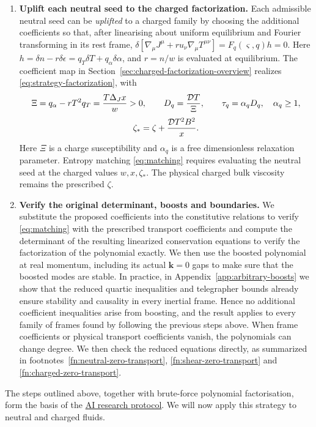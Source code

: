 \begin{enumerate}
\item \textbf{Uplift each neutral seed to the charged factorization.}
Each admissible neutral seed can be \emph{uplifted} to a charged family by
choosing the additional coefficients so that, after linearising about
uniform equilibrium and Fourier transforming in its rest frame,
$\delta[\nabla_\mu J^\mu+r u_\nu\nabla_\mu T^{\mu\nu}]
=F_q(\varsigma,q)h=0$.
Here $h=\delta n-r\delta\epsilon=q_T\delta T+q_\alpha\delta\alpha$,
and $r=n/w$ is evaluated at equilibrium. The coefficient map in
Section~\ref{sec:charged-factorization-overview} realizes
\eqref{eq:strategy-factorization}, with
\begin{equation}\label{eq:effective}
 \begin{gathered}
 \Xi=q_\alpha-rT^2q_T=\frac{T\Delta_Jx}{w}>0,\qquad
 D_q=\frac{\mathcal D T}{\Xi},\qquad
 \tau_q=\alpha_qD_q,\quad\alpha_q\geq1,\\[3pt]
 \zeta_* =\zeta+\frac{\mathcal D T^2B^2}{x}.
 \end{gathered}
\end{equation}
Here $\Xi$ is a charge susceptibility and $\alpha_q$ is a free
dimensionless relaxation parameter. Entropy matching \eqref{eq:matching}
requires evaluating the neutral seed at the charged values $w,x,\zeta_*$.
The physical charged bulk viscosity remains the prescribed $\zeta$.

\item \textbf{Verify the original determinant, boosts and boundaries.}
We substitute the proposed coefficients into the constitutive relations to verify \eqref{eq:matching} with the prescribed transport coefficients and compute the determinant of the resulting linearized conservation equations to verify the factorization of the polynomial exactly. We then use the boosted polynomial
at real momentum, including its actual $\mathbf k=0$
gaps to make sure that the boosted modes are stable.  In practice, in Appendix~\ref{app:arbitrary-boosts} we show that the reduced quartic inequalities and telegrapher bounds already ensure stability and causality in every inertial frame. Hence no additional coefficient inequalities arise from boosting, and the result applies to every family of frames found by following the previous steps above. When frame coefficients or physical transport coefficients vanish, the
polynomials can change degree. We then check the reduced equations
directly, as summarized in footnotes~\ref{fn:neutral-zero-transport},
\ref{fn:shear-zero-transport} and \ref{fn:charged-zero-transport}.
\end{enumerate}
The steps outlined above, together with brute-force polynomial
factorisation, form the basis of the
\href{https://jacomearmas.org/research/BDNK}{AI research protocol}. 
We will now apply this strategy to neutral and charged fluids.


